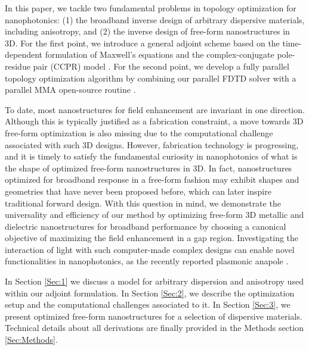 \documentclass[aps,prl,twocolumn,superscriptaddress,longbibliography]{revtex4-1}
\begin{document}
\par
In this paper, we tackle two fundamental problems in topology optimization for nanophotonics: (1) the broadband inverse design of arbitrary dispersive materials, including anisotropy, and (2) the inverse design of free-form nanostructures in 3D. For the first point, we introduce a general adjoint scheme based on the time-dependent formulation of Maxwell’s equations and the complex-conjugate pole-residue pair (CCPR) model \cite{material}.
For the second point, we develop a fully parallel topology optimization algorithm by combining our parallel FDTD solver \cite{convergence} with a parallel MMA open-source routine \cite{MMA_Parallel}.\par
To date, most nanostructures for field enhancement are invariant in one direction. Although this is typically justified as a fabrication constraint, a move towards 3D free-form optimization is also missing due to the computational challenge associated with such 3D designs. 
However, fabrication technology is progressing, and it is timely to satisfy the fundamental curiosity in nanophotonics of what is the shape of optimized free-form nanostructures in 3D. In fact, nanostructures optimized for broadband response in a free-form fashion may exhibit shapes and geometries that have never been proposed before, which can later inspire traditional forward design. With this question in mind, we demonstrate the universality and efficiency of our method by optimizing free-form 3D metallic and dielectric nanostructures for broadband performance by choosing a canonical objective of maximizing the field enhancement in a gap region. Investigating the interaction of light with such computer-made complex designs can enable novel functionalities in nanophotonics, as the recently reported plasmonic anapole \cite{anapolePaper}.\par
In Section \ref{Sec:1} we discuss a model for arbitrary dispersion and anisotropy used within our adjoint formulation. In Section \ref{Sec:2}, we describe the optimization setup and the computational challenges associated to it. In Section \ref{Sec:3}, we present optimized free-form nanostructures for a selection of dispersive materials. Technical details about all derivations are finally provided in the Methods section \ref{Sec:Methods}.

\end{document}
